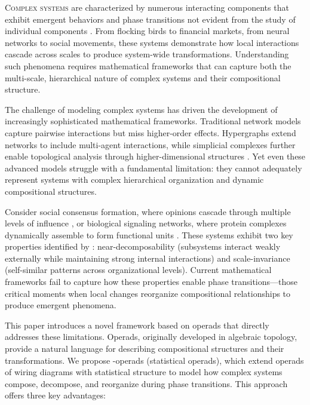 \lettrine[lines=2, findent=3pt, nindent=0pt]{C}{omplex systems} are characterized by numerous interacting components that exhibit emergent behaviors and phase transitions not evident from the study of individual components \citep{mitchell2009complexity}. From flocking birds to financial markets, from neural networks to social movements, these systems demonstrate how local interactions cascade across scales to produce system-wide transformations. Understanding such phenomena requires mathematical frameworks that can capture both the multi-scale, hierarchical nature of complex systems and their compositional structure.

The challenge of modeling complex systems has driven the development of increasingly sophisticated mathematical frameworks. Traditional network models capture pairwise interactions but miss higher-order effects. Hypergraphs extend networks to include multi-agent interactions, while simplicial complexes further enable topological analysis through higher-dimensional structures \citep{battiston2020networks}. Yet even these advanced models struggle with a fundamental limitation: they cannot adequately represent systems with complex hierarchical organization and dynamic compositional structures.

Consider social consensus formation, where opinions cascade through multiple levels of influence \citep{watts1998collective}, or biological signaling networks, where protein complexes dynamically assemble to form functional units \citep{giovannoni2017dynamic}. These systems exhibit two key properties identified by \citet{simon1962architecture}: near-decomposability (subsystems interact weakly externally while maintaining strong internal interactions) and scale-invariance (self-similar patterns across organizational levels). Current mathematical frameworks fail to capture how these properties enable phase transitions—those critical moments when local changes reorganize compositional relationships to produce emergent phenomena.

This paper introduces a novel framework based on operads that directly addresses these limitations. Operads, originally developed in algebraic topology, provide a natural language for describing compositional structures and their transformations. We propose \sigma-operads (statistical operads), which extend operads of wiring diagrams with statistical structure to model how complex systems compose, decompose, and reorganize during phase transitions. This approach offers three key advantages:

